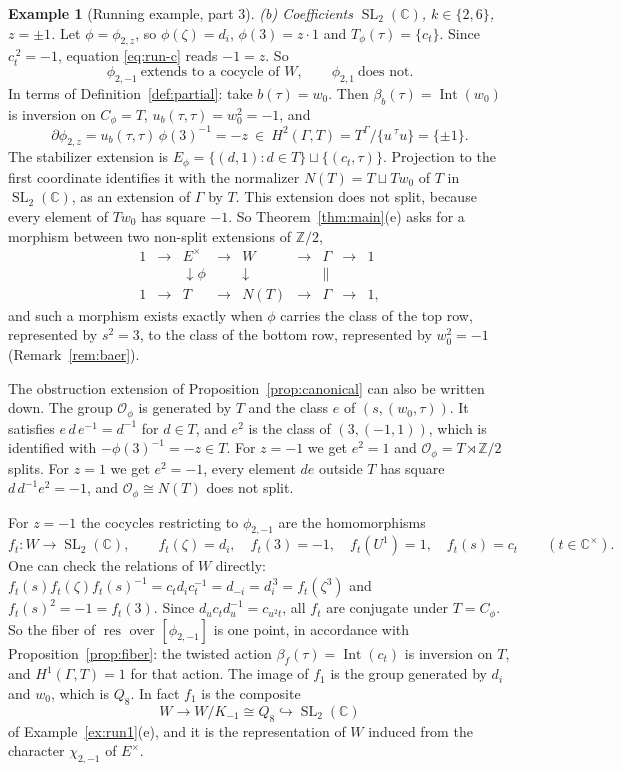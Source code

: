 \documentclass[12pt,letterpaper]{article}
\numberwithin{equation}{section}
\theoremstyle{plain}
\theoremstyle{definition}
\newtheorem{example}[theorem]{Example}
\newcommand{\Z}{\mathbb{Z}}
\newcommand{\C}{\mathbb{C}}
\newcommand{\act}[2]{{}^{#1}\!#2}          %
\DeclareMathOperator{\Int}{Int}
\DeclareMathOperator{\SL}{SL}
\DeclareMathOperator{\res}{res}
\begin{document}
\begin{example}[Running example, part 3]
\smallskip\noindent\emph{(b) Coefficients $\SL_2(\C)$, $k\in\{2,6\}$,
$z=\pm1$.} Let $\phi=\phi_{2,z}$, so $\phi(\zeta)=d_i$, $\phi(3)=z\cdot1$
and $T_\phi(\tau)=\{c_t\}$. Since $c_t^{\,2}=-1$, equation
\eqref{eq:run-c} reads $-1=z$. So
\[
\phi_{2,-1}\ \text{extends to a cocycle of } W,\qquad
\phi_{2,1}\ \text{does not}.
\]
In terms of Definition~\ref{def:partial}: take $b(\tau)=w_0$. Then
$\beta_b(\tau)=\Int(w_0)$ is inversion on $C_\phi=T$,
$u_b(\tau,\tau)=w_0^2=-1$, and
\[
\partial\phi_{2,z}=u_b(\tau,\tau)\,\phi(3)^{-1}=-z\ \in\
H^2(\Gamma,T)=T^\Gamma/\{u\,\act{\tau}{u}\}=\{\pm1\}.
\]
The stabilizer extension is
$E_\phi=\{(d,1):d\in T\}\sqcup\{(c_t,\tau)\}$. Projection to the first
coordinate identifies it with the normalizer $N(T)=T\sqcup Tw_0$ of $T$
in $\SL_2(\C)$, as an extension of $\Gamma$ by $T$. This extension does
not split, because every element of $Tw_0$ has square $-1$. So
Theorem~\ref{thm:main}(e) asks for a morphism between two non-split
extensions of $\Z/2$,
\[
\begin{array}{ccccccccc}
1&\to&E^\times&\to&W&\to&\Gamma&\to&1\\
&&\downarrow{\scriptstyle\phi}&&\downarrow&&\|&&\\
1&\to&T&\to&N(T)&\to&\Gamma&\to&1 ,
\end{array}
\]
and such a morphism exists exactly when $\phi$ carries the class of the
top row, represented by $s^2=3$, to the class of the bottom row,
represented by $w_0^2=-1$ (Remark~\ref{rem:baer}).

The obstruction extension of Proposition~\ref{prop:canonical} can also be
written down. The group $\mathcal{O}_\phi$ is generated by $T$ and the
class $e$ of $(s,(w_0,\tau))$. It satisfies $e\,d\,e^{-1}=d^{-1}$ for
$d\in T$, and $e^2$ is the class of $(3,(-1,1))$, which is identified with
$-\phi(3)^{-1}=-z\in T$. For $z=-1$ we get $e^2=1$ and
$\mathcal{O}_\phi=T\rtimes\Z/2$ splits. For $z=1$ we get $e^2=-1$, every
element $de$ outside $T$ has square $d\,d^{-1}e^2=-1$, and
$\mathcal{O}_\phi\cong N(T)$ does not split.

For $z=-1$ the cocycles restricting to $\phi_{2,-1}$ are the
homomorphisms
\[
f_t:W\to\SL_2(\C),\qquad f_t(\zeta)=d_i,\quad f_t(3)=-1,\quad
f_t(U^1)=1,\quad f_t(s)=c_t\qquad(t\in\C^\times).
\]
One can check the relations of $W$ directly:
$f_t(s)f_t(\zeta)f_t(s)^{-1}=c_td_ic_t^{-1}=d_{-i}=d_i^{\,3}=f_t(\zeta^3)$
and $f_t(s)^2=-1=f_t(3)$. Since $d_uc_td_u^{-1}=c_{u^2t}$, all $f_t$ are
conjugate under $T=C_\phi$. So the fiber of $\res$ over $[\phi_{2,-1}]$ is
one point, in accordance with Proposition~\ref{prop:fiber}: the twisted
action $\beta_f(\tau)=\Int(c_t)$ is inversion on $T$, and
$H^1(\Gamma,T)=1$ for that action. The image of $f_1$ is the group
generated by $d_i$ and $w_0$, which is $Q_8$. In fact $f_1$ is the
composite
\[
W\longrightarrow W/K_{-1}\cong Q_8\hookrightarrow\SL_2(\C)
\]
of Example~\ref{ex:run1}(e), and it is the representation of $W$ induced
from the character $\chi_{2,-1}$ of $E^\times$.


\end{example}
\end{document}
